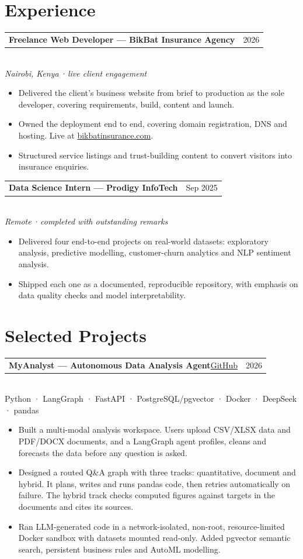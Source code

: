\documentclass[10pt,a4paper]{article}
\makeatletter
\newcommand{\meta}[1]{{\color{muted}#1}}
\newcommand{\entry}[3]{%
  \begin{tabularx}{\linewidth}{@{}X r@{}}
    {\fontsize{10.5}{12.5}\selectfont\bfseries #1} & \meta{#2} \\
  \end{tabularx}\\[-1pt]
  {\color{muted}\itshape #3}\par
}
\newcommand{\project}[5]{%
  \begin{tabularx}{\linewidth}{@{}X r@{}}
    {\fontsize{10.5}{12.5}\selectfont\bfseries #1}\hspace{0.5em}\href{#3}{\color{accent}\small #2} & \meta{#4} \\
  \end{tabularx}\\[-1pt]
  {\color{muted}\small #5}\par
}
\makeatother
\begin{document}
\section{Experience}
\entry{Freelance Web Developer — BikBat Insurance Agency}{2026}{Nairobi, Kenya\,·\,live client engagement}
\begin{itemize}
  \item Delivered the client's business website from brief to production as the sole developer, covering requirements, build, content and launch.
  \item Owned the deployment end to end, covering domain registration, DNS and hosting. Live at \href{https://bikbatinsurance.com}{\color{accent}\mbox{bikbatinsurance.com}}.
  \item Structured service listings and trust-building content to convert visitors into insurance enquiries.
\end{itemize}

\vspace{6pt}
\entry{Data Science Intern — Prodigy InfoTech}{Sep 2025}{Remote\,·\,completed with outstanding remarks}
\begin{itemize}
  \item Delivered four end-to-end projects on real-world datasets: exploratory analysis, predictive modelling, customer-churn analytics and NLP sentiment analysis.
  \item Shipped each one as a documented, reproducible repository, with emphasis on data quality checks and model interpretability.
\end{itemize}

\section{Selected Projects}

\project{MyAnalyst — Autonomous Data Analysis Agent}{GitHub}{https://github.com/Calvin-Gacheru/Automated-Junior-Analyst}{2026}
  {Python · LangGraph · FastAPI · PostgreSQL/pgvector · Docker · DeepSeek · pandas}
\begin{itemize}
  \item Built a multi-modal analysis workspace. Users upload CSV/XLSX data and PDF/DOCX documents, and a LangGraph agent profiles, cleans and forecasts the data before any question is asked.
  \item Designed a routed Q\&A graph with three tracks: quantitative, document and hybrid. It plans, writes and runs pandas code, then retries automatically on failure. The hybrid track checks computed figures against targets in the documents and cites its sources.
  \item Ran LLM-generated code in a network-isolated, non-root, resource-limited Docker sandbox with datasets mounted \mbox{read-only}. Added pgvector semantic search, persistent business rules and AutoML modelling.
\end{itemize}
\end{document}

